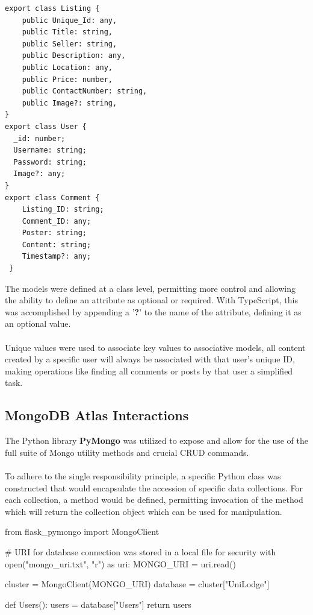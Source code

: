 \begin{lstlisting}[caption=Definiton of Database Models]
export class Listing { 
    public Unique_Id: any,
    public Title: string,
    public Seller: string,
    public Description: any,
    public Location: any,
    public Price: number,
    public ContactNumber: string,
    public Image?: string,
}
export class User { 
  _id: number;
  Username: string;
  Password: string;
  Image?: any;
}
export class Comment { 
    Listing_ID: string;
    Comment_ID: any;
    Poster: string;
    Content: string;
    Timestamp?: any;
 }
\end{lstlisting}

The models were defined at a class level, permitting more control and allowing the ability to define an attribute as optional or required. With TypeScript, this was accomplished by appending a '\textbf{?}' to the name of the attribute, defining it as an optional value.

\paragraph{}
Unique values were used to associate key values to associative models, all content created by a specific user will always be associated with that user's unique ID, making operations like finding all comments or posts by that user a simplified task.

\subsection{MongoDB Atlas Interactions}
The Python library \textbf{PyMongo} was utilized to expose and allow for the use of the full suite of Mongo utility methods and crucial CRUD commands. 

\paragraph{}
To adhere to the single responsibility principle, a specific Python class was constructed that would encapsulate the accession of specific data collections. For each collection, a method would be defined, permitting invocation of the method which will return the collection object which can be used for manipulation. \newline

\begin{python}[caption=Database Accession Class]
from flask_pymongo import MongoClient

# URI for database connection was stored in a local file for security
with open("mongo_uri.txt", "r") as uri:
    MONGO_URI = uri.read()
    
cluster = MongoClient(MONGO_URI)
database = cluster["UniLodge"]

def Users():
    users = database["Users"]
    return users
\end{python}

